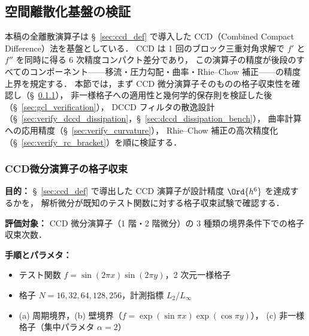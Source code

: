 %
\subsection{空間離散化基盤の検証}
\label{sec:verify_spatial}

本稿の全離散演算子は §~\ref{sec:ccd_def} で導入した CCD（Combined Compact Difference）法を基盤としている．
CCD は 1 回のブロック三重対角求解で $f'$ と $f''$ を同時に得る 6 次精度コンパクト差分であり，
この演算子の精度が後段のすべてのコンポーネント——移流・圧力勾配・曲率・Rhie--Chow 補正——の精度上界を規定する．
本節では，まず CCD 微分演算子そのものの格子収束性を確認し（§~\ref{sec:verify_ccd_convergence}），
非一様格子への適用性と幾何学的保存則を検証した後（§~\ref{sec:gcl_verification}），
DCCD フィルタの散逸設計（§~\ref{sec:verify_dccd_dissipation}，§~\ref{sec:dccd_dissipation_bench}），
曲率計算への応用精度（§~\ref{sec:verify_curvature}），
Rhie--Chow 補正の高次精度化（§~\ref{sec:verify_rc_bracket}）を順に検証する．

\subsubsection{CCD微分演算子の格子収束}
\label{sec:verify_ccd_convergence}

\noindent\textbf{目的：}
§~\ref{sec:ccd_def} で導出した CCD 演算子が設計精度 $\Ord{h^6}$ を達成するかを，
解析微分が既知のテスト関数に対する格子収束試験で確認する．

\noindent\textbf{評価対象：}
CCD 微分演算子（1 階・2 階微分）の 3 種類の境界条件下での格子収束次数．

\noindent\textbf{手順とパラメタ：}
\begin{itemize}[noitemsep]
  \item テスト関数 $f = \sin(2\pi x)\sin(2\pi y)$，2 次元一様格子
  \item 格子 $N = 16, 32, 64, 128, 256$，計測指標 $L_2$/$L_\infty$
  \item (a) 周期境界，(b) 壁境界（$f = \exp(\sin\pi x)\exp(\cos\pi y)$），
        (c) 非一様格子（集中パラメタ $\alpha=2$）
\end{itemize}

